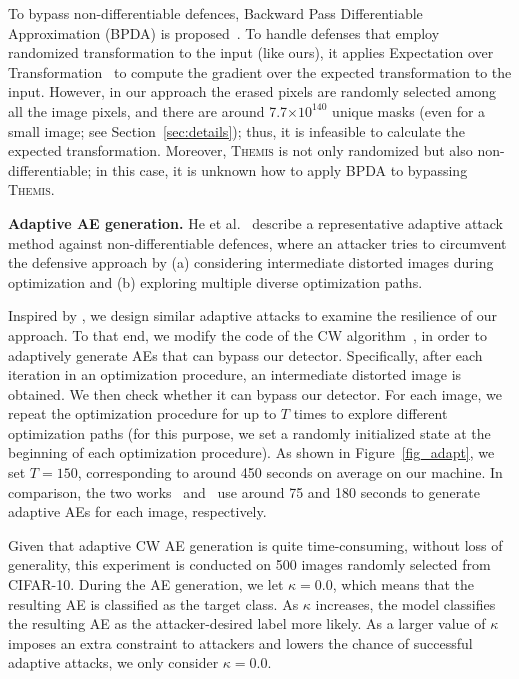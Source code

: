 \documentclass[sigconf]{acmart}
\newcommand{\oursys}{\textsc{Themis}\xspace}
\begin{document}
To bypass non-differentiable defences, Backward Pass Differentiable Approximation (BPDA) is proposed~\cite{obfuscated-gradients}. To handle defenses that employ 
randomized transformation to the input (like ours), it applies 
Expectation over Transformation~\cite{athalye2018synthesizing} to compute the gradient over the expected
transformation to the input. However, in our approach the erased pixels 
are randomly selected among all the image pixels, and there are 
around 7.7$\times 10^{140}$ unique masks  (even for a small image; see Section~\ref{sec:details}); 
thus, it is infeasible to
calculate the expected transformation. Moreover, \oursys is not only
randomized but also non-differentiable; in this case, it is unknown
how to apply BPDA to bypassing \oursys. 



\vspace{3pt}
\noindent \textbf{Adaptive AE generation.}
He et al.~\cite{he2017adversarial} describe a representative adaptive attack method
against non-differentiable defences, where 
an attacker tries to circumvent the defensive approach by (a) considering intermediate distorted images during optimization
and (b) exploring multiple diverse 
optimization paths. 

Inspired by \cite{he2017adversarial},  we design similar adaptive attacks to examine the resilience of 
our approach.
To that end, we modify the code of the CW algorithm~\cite{carlini2017towards}, in order to adaptively generate AEs that can bypass our detector. 
Specifically, after each iteration in an optimization procedure, an intermediate 
distorted image is obtained. We then check whether it can bypass our detector. For each image,
we repeat the optimization procedure for up to $T$ times to explore different optimization paths 
(for this purpose, we set a randomly initialized state at the beginning of each optimization procedure). 
As shown in Figure~\ref{fig_adapt}, we set $T=150$, corresponding to
around 450 seconds on average on our machine.
In comparison,
the two works~\cite{tian2018detecting} and~\cite{he2017adversarial} use around 
75 and 180 seconds to generate adaptive AEs for each image, respectively.  

Given that adaptive CW AE generation is quite time-consuming, without loss of generality,
this experiment is conducted on 500 images randomly selected from CIFAR-10.
During the AE generation, we 
let $\kappa=0.0$, which means that the resulting AE is classified as the target class. 
As $\kappa$ increases, the model classifies the resulting AE as the attacker-desired label more likely. 
As a larger value of $\kappa$ imposes an extra constraint to attackers and lowers the
chance of successful adaptive attacks, we only consider $\kappa=0.0$.
\end{document}

